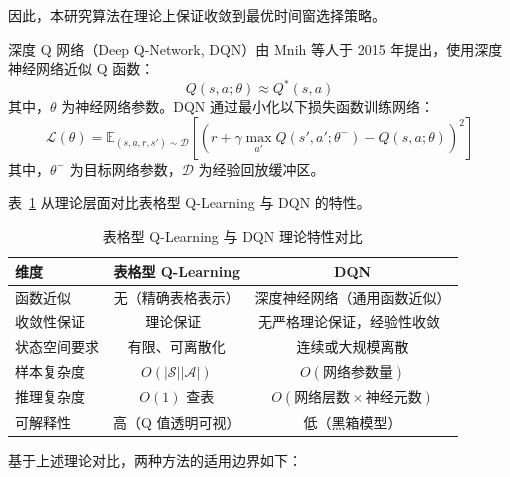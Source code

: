 因此，本研究算法在理论上保证收敛到最优时间窗选择策略。

\label{sec:comparison}

\label{subsec:dqn_review}

深度 Q 网络（Deep Q-Network, DQN）由 Mnih 等人于 2015 年提出\cite{mnih2015human}，使用深度神经网络近似 Q 函数：
\begin{equation}
Q(s, a; \theta) \approx Q^*(s, a)
\end{equation}
其中，$\theta$ 为神经网络参数。DQN 通过最小化以下损失函数训练网络：
\begin{equation}
\mathcal{L}(\theta) = \mathbb{E}_{(s,a,r,s') \sim \mathcal{D}} \left[ \left( r + \gamma \max_{a'} Q(s', a'; \theta^-) - Q(s, a; \theta) \right)^2 \right]
\end{equation}
其中，$\theta^-$ 为目标网络参数，$\mathcal{D}$ 为经验回放缓冲区。

\label{subsec:theoretical_comparison}

表~\ref{tab:comparison} 从理论层面对比表格型 Q-Learning 与 DQN 的特性。

\begin{table}[H]
\centering
\caption{表格型 Q-Learning 与 DQN 理论特性对比}
\label{tab:comparison}
\begin{tabular}{lcc}
\hline
\textbf{维度} & \textbf{表格型 Q-Learning} & \textbf{DQN} \\
\hline
函数近似 & 无（精确表格表示） & 深度神经网络（通用函数近似） \\
收敛性保证 & 理论保证~\cite{watkins1992q} & 无严格理论保证，经验性收敛~\cite{mnih2015human} \\
状态空间要求 & 有限、可离散化 & 连续或大规模离散 \\
样本复杂度 & $O(|\mathcal{S}||\mathcal{A}|)$ & $O(\text{网络参数量})$ \\
推理复杂度 & $O(1)$ 查表 & $O(\text{网络层数} \times \text{神经元数})$ \\
可解释性 & 高（Q 值透明可视） & 低（黑箱模型） \\
\hline
\end{tabular}
\end{table}

\label{subsec:applicability}

基于上述理论对比，两种方法的适用边界如下：

